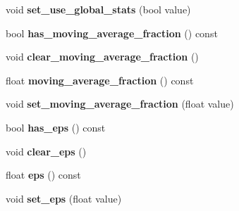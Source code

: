 \begin{DoxyCompactItemize}
void {\bfseries set\+\_\+use\+\_\+global\+\_\+stats} (bool value)
\item 
\mbox{\label{classcaffe_1_1_batch_norm_parameter_a5e14cd709d4abb5c44598108dcf7a735}} 
bool {\bfseries has\+\_\+moving\+\_\+average\+\_\+fraction} () const
\item 
\mbox{\label{classcaffe_1_1_batch_norm_parameter_a91b384d668d9906f8da908e19731c0ed}} 
void {\bfseries clear\+\_\+moving\+\_\+average\+\_\+fraction} ()
\item 
\mbox{\label{classcaffe_1_1_batch_norm_parameter_a5963141535149e128d497894c16c2184}} 
float {\bfseries moving\+\_\+average\+\_\+fraction} () const
\item 
\mbox{\label{classcaffe_1_1_batch_norm_parameter_a35af63a119670da04c8e4b40e41002cd}} 
void {\bfseries set\+\_\+moving\+\_\+average\+\_\+fraction} (float value)
\item 
\mbox{\label{classcaffe_1_1_batch_norm_parameter_a7eac5264f0529366a20d05e0891d58ac}} 
bool {\bfseries has\+\_\+eps} () const
\item 
\mbox{\label{classcaffe_1_1_batch_norm_parameter_ae5226aba1ce892c2cb1e95552510c1f9}} 
void {\bfseries clear\+\_\+eps} ()
\item 
\mbox{\label{classcaffe_1_1_batch_norm_parameter_ae2d35b5bec59906be4d0e5e86f3300cd}} 
float {\bfseries eps} () const
\item 
\mbox{\label{classcaffe_1_1_batch_norm_parameter_a89b02ef090d3de548a0fea8aa8f37d93}} 
void {\bfseries set\+\_\+eps} (float value)
\end{DoxyCompactItemize}
